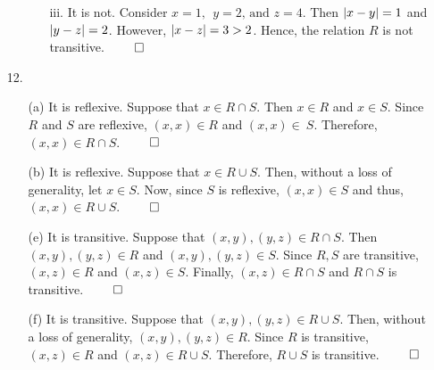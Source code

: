 \documentclass[12pt, a4paper]{article}
\newcommand\und[1]{\underline{\smash{#1}}}
\DeclarePairedDelimiter\abs{\lvert}{\rvert}
\begin{document}
\begin{itemize}
\begin{itemize}
\begin{itemize}
\item[]

\item[iii.]
It is not. Consider $x = 1, \ \ y = 2 \mbox{, and } z = 4$. Then $\abs{x - y} = 1$
and $\abs{y - z} = 2$. However, $\abs{x - z} = 3 > 2$. Hence, the relation $R$ is not transitive.
$\qed$
\end{itemize}
\end{itemize}

\item[]
\item[]

\item[12.]
\begin{itemize}
\item[(a)]
It is reflexive. Suppose that $x \in R \cap S$. Then $x \in R$ and $x \in S$. Since $R$ and $S$
are reflexive, $(x, x) \in R$ and $(x, x) \in \ S$. Therefore, $(x,x) \in R \cap S$.
$\qed$

\item[]

\item[(b)]
It is reflexive. Suppose that $x \in R \cup S$. Then, without a loss of generality, let $x \in S$.
Now, since $S$ is reflexive, $(x, x) \in S$ and thus, $(x, x) \in R \cup S$.
$\qed$

\item[]

\item[(e)]
It is transitive. Suppose that $(x, y), (y, z) \in R \cap S$. Then $(x, y), (y, z) \in R$
and $(x, y), (y, z) \in S$. Since $R, S$ are transitive, $(x, z) \in R$ and $(x, z) \in S$.
Finally, $(x, z) \in R \cap S$ and $R \cap S$ is transitive.
$\qed$

\item[]

\item[(f)]
It is transitive. Suppose that $(x, y), (y, z) \in R \cup S$. Then, without a loss of generality, $(x, y), (y, z) \in R$.
Since $R$ is transitive, $(x, z) \in R$ and $(x, z) \in R \cup S$. Therefore, $R \cup S$ is transitive.
$\qed$
\end{itemize}

\item[]
\item[]
\item[]

{\Large \textbf{\und{4.4}}}

\item[]


\end{itemize}
\end{document}
